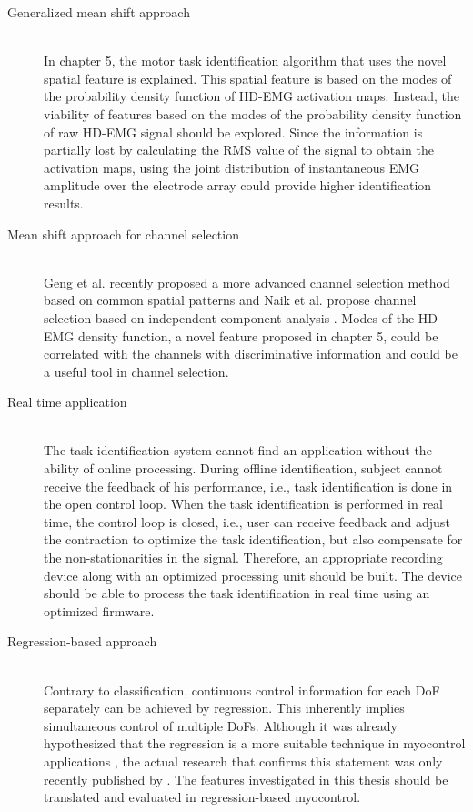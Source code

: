 \begin{description}

\item[Generalized mean shift approach] \hfill \\
	In chapter 5, the motor task identification algorithm that uses the novel spatial feature is explained. This spatial feature is based on the modes of the probability density function of HD-EMG activation maps. Instead, the viability of features based on the  modes of the probability density function of raw HD-EMG signal should be explored. Since the information is partially lost by calculating the RMS value of the signal to obtain the activation maps, using the joint distribution of instantaneous EMG amplitude over the electrode array could provide higher identification results.
	
\item[Mean shift approach for channel selection] \hfill \\
	Geng et al. recently proposed a more advanced channel selection method based on common spatial patterns \citep{Geng2014} and Naik et al. propose channel selection based on independent component analysis \citep{Naik2016}. Modes of the HD-EMG density function, a novel feature proposed in chapter 5, could be correlated with the channels with discriminative information and could be a useful tool in channel selection.

\item[Real time application] \hfill \\
	The task identification system cannot find an application without the ability of online processing. During offline identification, subject cannot receive the feedback of his performance, i.e., task identification is done in the open control loop. When the task identification is performed in real time, the control loop is closed, i.e., user can receive feedback and adjust the contraction to optimize the task identification, but also compensate for the non-stationarities in the signal. Therefore, an appropriate recording device along with an optimized processing unit should be built. The device should be able to process the task identification in real time using an optimized firmware.
	
\item[Regression-based approach] \hfill \\
	Contrary to classification, continuous control information for each DoF separately can be achieved by regression. This inherently implies simultaneous control of multiple DoFs. Although it was already hypothesized that the regression is a more suitable technique in myocontrol applications \citep{Jiang2012}, the actual research that confirms this statement was only recently published by \citet{Hahne2017}. The features investigated in this thesis should be translated and evaluated in regression-based myocontrol. 


\end{description}
